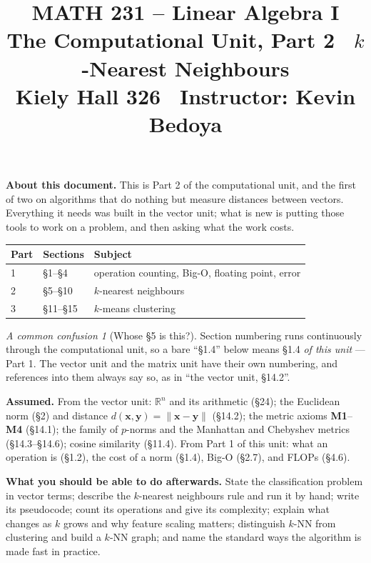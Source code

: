\documentclass[11pt]{article}
\title{\vspace{-1.2cm}\textbf{\sffamily MATH 231 -- Linear Algebra I}\\[4pt]
       {\large\sffamily The Computational Unit, Part 2 \textbullet\
        $k$-Nearest Neighbours}\\[2pt]
       {\normalsize\sffamily Kiely Hall 326 \textbullet\
        Instructor: Kevin Bedoya}}
\author{}
\date{}
\theoremstyle{plain}
\theoremstyle{definition}
\theoremstyle{remark}
\newtheorem*{warn}{A common confusion}
\newcommand{\R}{\mathbb{R}}
\newcommand{\vc}[1]{\mathbf{#1}}
\newcommand{\norm}[1]{\lVert #1\rVert}
\begin{document}
\setcounter{section}{4}   %
\maketitle
\vspace{-1.6cm}

\noindent\textbf{About this document.} This is Part 2 of the computational
unit, and the first of two on algorithms that do nothing but measure distances
between vectors. Everything it needs was built in the vector unit; what is new
is putting those tools to work on a problem, and then asking what the work
costs.

\begin{center}
\renewcommand{\arraystretch}{1.2}
\begin{tabular}{@{}l l l@{}}
\toprule
\textbf{Part} & \textbf{Sections} & \textbf{Subject} \\
\midrule
1 & \S1--\S4    & operation counting, Big-O, floating point, error \\
2 & \S5--\S10   & $k$-nearest neighbours \\
3 & \S11--\S15  & $k$-means clustering \\
\bottomrule
\end{tabular}
\end{center}

\begin{warn}[Whose \S5 is this?]
Section numbering runs continuously through the computational unit, so a bare
``\S1.4'' below means \S1.4 \emph{of this unit} --- Part 1. The vector unit and
the matrix unit have their own numbering, and references into them always say
so, as in ``the vector unit, \S14.2''.
\end{warn}

\medskip
\noindent\textbf{Assumed.} From the vector unit: $\R^{n}$ and its arithmetic
(\S24); the Euclidean norm (\S2) and distance $d(\vc{x},\vc{y})=\norm{\vc{x}-\vc{y}}$
(\S14.2); the metric axioms \textbf{M1}--\textbf{M4} (\S14.1); the family of
$p$-norms and the Manhattan and Chebyshev metrics (\S14.3--\S14.6); cosine
similarity (\S11.4). From Part 1 of this unit: what an operation is (\S1.2), the
cost of a norm (\S1.4), Big-O (\S2.7), and FLOPs (\S4.6).

\medskip
\noindent\textbf{What you should be able to do afterwards.} State the
classification problem in vector terms; describe the $k$-nearest neighbours rule
and run it by hand; write its pseudocode; count its operations and give its
complexity; explain what changes as $k$ grows and why feature scaling matters;
distinguish $k$-NN from clustering and build a $k$-NN graph; and name the
standard ways the algorithm is made fast in practice.
\end{document}
